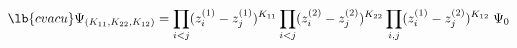 \begin{equation}
\lb{cvacu}
\Psi_{(K_{11},K_{22},K_{12})}=
\prod_{i<j} (z_i^{(1)}-z_j^{(1)})^{K_{11}}
\prod_{i<j} (z_i^{(2)}-z_j^{(2)})^{K_{22}}
\prod_{i,j} (z_i^{(1)}-z_j^{(2)})^{K_{12}} \; \Psi_{0}
\end{equation}

